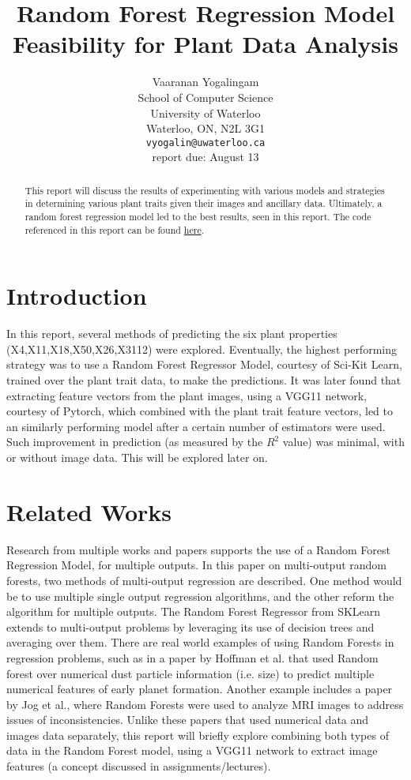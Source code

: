 \documentclass{article}
\title{Random Forest Regression Model Feasibility for Plant Data Analysis}
\author{
	Vaaranan Yogalingam \\
	School of Computer Science\\
	University of Waterloo\\
	Waterloo, ON, N2L 3G1 \\
	\texttt{vyogalin@uwaterloo.ca} \\
	{\color{red} report due: August 13}
}
\begin{document}
\maketitle

\begin{abstract} 
This report will discuss the results of experimenting with various models and strategies in determining various plant traits given their images and ancillary data. Ultimately, a random forest regression model led to the best results, seen in this report. The code referenced in this report can be found \href{https://github.com/vaaranan-y/CS480-Final-Project}{here}.
\end{abstract} 

\section{Introduction}
In this report, several methods of predicting the six plant properties (X4,X11,X18,X50,X26,X3112) were explored. Eventually, the highest performing strategy was to use a Random Forest Regressor Model, courtesy of Sci-Kit Learn, trained over the plant trait data, to make the predictions. It was later found that extracting feature vectors from the plant images, using a VGG11 network, courtesy of Pytorch, which combined with the plant trait feature vectors, led to an similarly performing model after a certain number of estimators were used. Such improvement in prediction (as measured by the $R^2$ value) was minimal, with or without image data. This will be explored later on.

\section{Related Works}
Research from multiple works and papers supports the use of a Random Forest Regression Model, for multiple outputs. In this paper on multi-output random forests, two methods of multi-output regression are described. One method would be to use multiple single output regression algorithms, and the other reform the algorithm for multiple outputs. The Random Forest Regressor from SKLearn extends to multi-output problems by leveraging its use of decision trees and averaging over them. There are real world examples of using Random Forests in regression problems, such as in a paper by Hoffman et al. that used Random forest over numerical dust particle information (i.e. size) to predict multiple numerical features of early planet formation. Another example includes a paper by Jog et al., where Random Forests were used to analyze MRI images to address issues of inconsistencies. Unlike these papers that used numerical data and images data separately, this report will briefly explore combining both types of data in the Random Forest model, using a VGG11 network to extract image features (a concept discussed in assignments/lectures).
\end{document}
